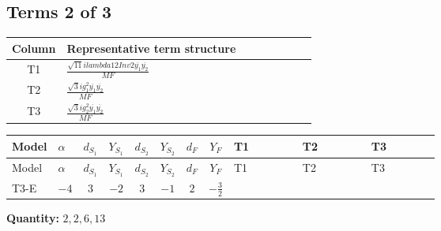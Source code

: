 \documentclass[8pt]{article}
\begin{document}
\begin{landscape}
\subsection*{Terms 2 of 3}
\begin{center}
\begin{tabular}{@{}c >{\raggedright\arraybackslash}p{0.82\linewidth}@{}}
\toprule
Column & Representative term structure \\
\midrule
T1 & \(\displaystyle \frac{\sqrt{11} i lambda12Inv2 \overline{y_{1}} \overline{y_{2}}}{MF}\) \\
\midrule
T2 & \(\displaystyle \frac{\sqrt{3} i g_{1}^{2} \overline{y_{1}} \overline{y_{2}}}{MF}\) \\
\midrule
T3 & \(\displaystyle \frac{\sqrt{3} i g_{2}^{2} \overline{y_{1}} \overline{y_{2}}}{MF}\) \\
\midrule
\bottomrule
\end{tabular}
\end{center}
\smallskip
\tiny
\begin{longtable}{@{}llcccccc >{\raggedright\arraybackslash}p{0.21\linewidth} >{\raggedright\arraybackslash}p{0.21\linewidth} >{\raggedright\arraybackslash}p{0.21\linewidth}@{}}
\toprule
Model & $\alpha$ & $d_{S_1}$ & $Y_{S_1}$ & $d_{S_2}$ & $Y_{S_2}$ & $d_F$ & $Y_F$ & T1 & T2 & T3 \\
\midrule
\endfirsthead
\toprule
Model & $\alpha$ & $d_{S_1}$ & $Y_{S_1}$ & $d_{S_2}$ & $Y_{S_2}$ & $d_F$ & $Y_F$ & T1 & T2 & T3 \\
\midrule
\endhead
T3-E & $-4$ & $3$ & $-2$ & $3$ & $-1$ & $2$ & $-\frac{3}{2}$ & \scriptsize\adjustbox{max width=\linewidth}{$\begin{gathered} \frac{3 \sqrt{11} i lambda12Inv2 \overline{y_{1}} \overline{y_{2}}}{22 MF}\end{gathered}$} & \scriptsize\adjustbox{max width=\linewidth}{$\begin{gathered} \frac{9 \sqrt{3} i g_{1}^{2} \overline{y_{1}} \overline{y_{2}}}{8 MF}\end{gathered}$} & \scriptsize\adjustbox{max width=\linewidth}{$\begin{gathered} \frac{49 \sqrt{3} i g_{2}^{2} \overline{y_{1}} \overline{y_{2}}}{24 MF}\end{gathered}$} \\
\midrule
\bottomrule
\end{longtable}
\clearpage
\noindent\textbf{Quantity: }$\mathrm{2,2,6,13}$\par\smallskip

\end{landscape}
\end{document}
